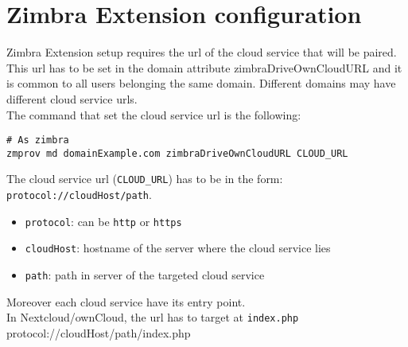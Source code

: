 \section{Zimbra Extension configuration}

    Zimbra Extension setup requires the url of the cloud service that will be paired.
    This url has to be set in the domain attribute zimbraDriveOwnCloudURL and 
    it is common to all users belonging the same domain.
    Different domains may have different cloud service urls.\\
    The command that set the cloud service url is the following:
    \begin{verbatim}
# As zimbra
zmprov md domainExample.com zimbraDriveOwnCloudURL CLOUD_URL
    \end{verbatim}

    The cloud service url (\texttt{CLOUD\_URL}) has to be in the form: \texttt{protocol://cloudHost/path}.

    \begin{itemize}
        \item{\texttt{protocol}: can be \texttt{http} or \texttt{https}}
        \item{\texttt{cloudHost}: hostname of the server where the cloud service lies}
        \item{\texttt{path}: path in server of the targeted cloud service}
    \end{itemize}

    Moreover each cloud service have its entry point.\\
    In Nextcloud/ownCloud, the url has to target at \texttt{index.php}\: protocol://cloudHost/path/index.php
